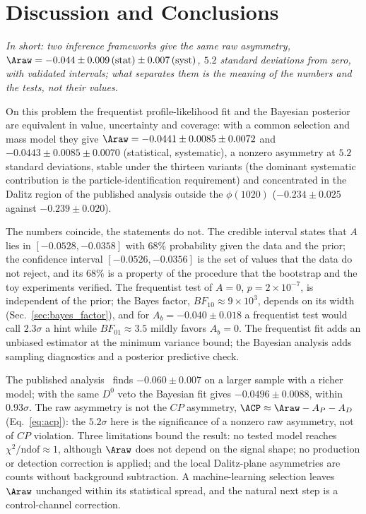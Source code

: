 \section{Discussion and Conclusions}
\label{sec:conclusions}
\label{sec:comparison}
\emph{In short: two inference frameworks give the same raw asymmetry, $\Araw=-0.044\pm0.009\,(\text{stat})\pm0.007\,(\text{syst})$, $5.2$ standard deviations from zero, with validated intervals; what separates them is the meaning of the numbers and the tests, not their values.}

On this problem the frequentist profile-likelihood fit and the Bayesian posterior are equivalent in value, uncertainty and coverage: with a common selection and mass model they give $\Araw=-0.0441\pm0.0085\pm0.0072$ and $-0.0443\pm0.0085\pm0.0070$ (statistical, systematic), a nonzero asymmetry at $5.2$ standard deviations, stable under the thirteen variants (the dominant systematic contribution is the particle-identification requirement) and concentrated in the Dalitz region of the published analysis outside the $\phi(1020)$ ($-0.234\pm0.025$ against $-0.239\pm0.020$).

The numbers coincide, the statements do not. The credible interval states that $A$ lies in $[-0.0528,-0.0358]$ with $68\%$ probability given the data and the prior; the confidence interval $[-0.0526,-0.0356]$ is the set of values that the data do not reject, and its $68\%$ is a property of the procedure that the bootstrap and the toy experiments verified. The frequentist test of $A=0$, $p=2\times10^{-7}$, is independent of the prior; the Bayes factor, $BF_{10}\approx9\times10^3$, depends on its width (Sec.~\ref{sec:bayes_factor}), and for $A_b=-0.040\pm0.018$ a frequentist test would call $2.3\sigma$ a hint while $BF_{01}\approx3.5$ mildly favors $A_b=0$. The frequentist fit adds an unbiased estimator at the minimum variance bound; the Bayesian analysis adds sampling diagnostics and a posterior predictive check.

\label{sec:comparison_published}
The published analysis~\cite{lhcb_cpv_2013} finds $-0.060\pm0.007$ on a larger sample with a richer model; with the same $D^0$ veto the Bayesian fit gives $-0.0496\pm0.0088$, within $0.93\sigma$. The raw asymmetry is not the $CP$ asymmetry, $\ACP\approx\Araw-A_P-A_D$ (Eq.~\eqref{eq:acp}): the $5.2\sigma$ here is the significance of a nonzero raw asymmetry, not of $CP$ violation. Three limitations bound the result: no tested model reaches $\chi^2/\mathrm{ndof}\approx1$, although $\Araw$ does not depend on the signal shape; no production or detection correction is applied; and the local Dalitz-plane asymmetries are counts without background subtraction. A machine-learning selection leaves $\Araw$ unchanged within its statistical spread, and the natural next step is a control-channel correction.
